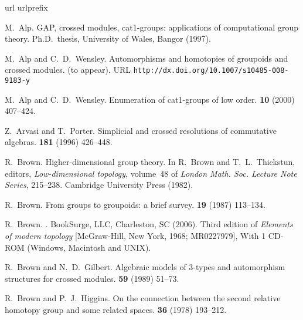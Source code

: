 
\begin{thebibliography}{notesdev}

\expandafter\ifx\csname url\endcsname\relax
  \def\url#1{{\tt #1}}\fi
\expandafter\ifx\csname urlprefix\endcsname\relax\def\urlprefix{URL }\fi

M.~Alp.
\newblock GAP, crossed modules, cat1-groups: applications of computational
  group theory.
\newblock Ph.{D}.~thesis, University of Wales, Bangor (1997).

M.~Alp and C.~D.~Wensley.
\newblock Automorphisms and homotopies of groupoids and crossed modules.
 (to appear).
\newline\urlprefix\url{http://dx.doi.org/10.1007/s10485-008-9183-y}

M.~Alp and C.~D.~Wensley.
\newblock Enumeration of cat1-groups of low order.
 {\bf 10} (2000) 407--424.

Z.~Arvasi and T.~Porter.
\newblock Simplicial and crossed resolutions of commutative algebras.
 {\bf 181} (1996) 426--448.

R.~Brown.
\newblock Higher-dimensional group theory.
\newblock In R.~Brown and T.~L.~Thickstun, editors, {\em Low-dimensional
  topology\/}, volume~48 of {\em London Math. Soc. Lecture Note Series\/},
  215--238. Cambridge University Press (1982).

R.~Brown.
\newblock From groups to groupoids: a brief survey.
 {\bf 19} (1987) 113--134.

R.~Brown.
.
\newblock BookSurge, LLC, Charleston, SC (2006).
\newblock Third edition of {\it Elements of modern topology} [McGraw-Hill, New
  York, 1968; MR0227979], With 1 CD-ROM (Windows, Macintosh and UNIX).

R.~Brown and N.~D.~Gilbert.
\newblock Algebraic models of 3-types and automorphism structures for crossed
  modules.
 {\bf 59} (1989) 51--73.

R.~Brown and P.~J.~Higgins.
\newblock On the connection between the second relative homotopy group and some
  related spaces.
 {\bf 36} (1978) 193--212.


\end{thebibliography}
